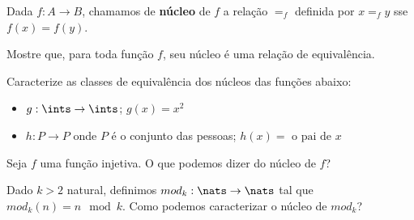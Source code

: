 \begin{definition}
Dada $f : A \to B$, chamamos de \textbf{núcleo} de $f$ a relação $=_f$ definida por $x =_f y$ sse $f(x) = f(y)$.
\end{definition}

\begin{exercise}
Mostre que, para toda função $f$, seu núcleo é uma relação de equivalência.
\end{exercise}

\begin{exercise}
Caracterize as classes de equivalência dos núcleos das funções abaixo:
    \begin{itemize}
        \item $g : \ints \to \ints$; $g(x) = x^2$
        \item $h : P \to P$ onde $P$ é o conjunto das pessoas; $h(x) = \text{ o pai de } x$
    \end{itemize}
\end{exercise}

\begin{exercise}
Seja $f$ uma função injetiva. O que podemos dizer do núcleo de $f$?
\end{exercise}

\begin{exercise}
Dado $k > 2$ natural, definimos $mod_k : \nats \to \nats$ tal que $mod_k(n) = n \mod k$. Como podemos caracterizar o núcleo de $mod_k$?
\end{exercise}
